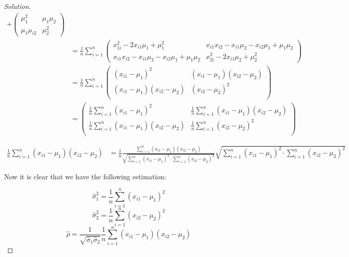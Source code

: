 \documentclass{article}
\newenvironment{solution}
  {\renewcommand\qedsymbol{$\blacksquare$}\begin{proof}[Solution]$ $}
  {\end{proof}}
\begin{document}
\begin{Exercise}
\begin{solution}
\begin{align*}
            + \begin{pmatrix}\mu_{1}^2 & \mu_{1}\mu_{2} \\ \mu_{1} \mu_{i2} & \mu_{2}^2\end{pmatrix}                                                  \\
                          & = \frac{1}{n} \sum_{i=1}^{n}
            \begin{pmatrix}
                x_{1i}^2 - 2x_{i1} \mu_1 + \mu_1^2                         & x_{i1}x_{i2} - x_{i1} \mu_2 - x_{i2} \mu_{1} + \mu_1 \mu_2 \\
                x_{i1}x_{i2} - x_{i1} \mu_2 - x_{i2} \mu_{1} + \mu_1 \mu_2 & x_{2i}^2 - 2x_{i1} \mu_2 + \mu_2^2
            \end{pmatrix}                   \\
                          & = \frac{1}{n} \sum_{i=1}^{n}
            \begin{pmatrix}
                (x_{i1} - \mu_1)^2               & (x_{i1} - \mu_1)(x_{i2} - \mu_2) \\
                (x_{i1} - \mu_1)(x_{i2} - \mu_2) & (x_{i2} - \mu_2)^2               \\
            \end{pmatrix}                                                                       \\
                          & =
            \begin{pmatrix}
                \frac{1}{n} \sum_{i=1}^{n} (x_{i1} - \mu_1)^2 &
                \frac{1}{n} \sum_{i=1}^{n} (x_{i1} - \mu_1)(x_{i2} - \mu_2)                                   \\
                \frac{1}{n} \sum_{i=1}^{n} (x_{i1} - \mu_1)(x_{i2} - \mu_2)
                                                              & \frac{1}{n} \sum_{i=1}^{n} (x_{i2} - \mu_2)^2 \\
            \end{pmatrix}
        \end{align*}

        \begin{align*}
            \frac{1}{n} \sum_{i=1}^{n} (x_{i1} - \mu_1)(x_{i2} - \mu_2) & =
            \frac{1}{n} \frac{\sum_{i=1}^{n} (x_{i1} - \mu_1)(x_{i2} - \mu_2)}{\sqrt{\sum_{i=1}^{n} (x_{i1} - \mu_1)^2 \cdot \sum_{i=1}^{n} (x_{i2} - \mu_2)^2}} \sqrt{\sum_{i=1}^{n} (x_{i1} - \mu_1)^2 \cdot \sum_{i=1}^{n} (x_{i2} - \mu_2)^2}
        \end{align*}

        Now it is clear that we have the following estimation:

        \[\hat{\sigma}_1^2 = \frac{1}{n} \sum_{i=1}^{n} (x_{i1} - \mu_1)^2 \]
        \[\hat{\sigma}_2^2 = \frac{1}{n} \sum_{i=1}^{n} (x_{i2} - \mu_2)^2 \]
        \[\hat \rho = \frac{1}{\sqrt{\hat \sigma_1 \hat \sigma_2}}\frac{1}{n} \sum_{i=1}^{n} (x_{i1} - \mu_1)(x_{i2} - \mu_2)\]
    \end{solution}
\end{Exercise}
\end{document}
